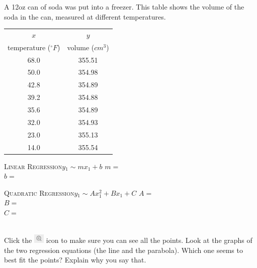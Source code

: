\documentclass[12pt,letterpaper]{memoir}
\begin{document}
{
    A 12oz can of soda was put into a freezer.
    This table shows the volume of the soda in the can,
    measured at different temperatures.\\[0.5em]
    \begin{minipage}{0.35\textwidth}
        \footnotesize
        \begin{tabular}{cc}
            $x$ & $y$ \\ 
            temperature (${}^\circ F$) & volume ($cm^3$) \\
            \midrule 
            68.0 & 355.51 \\
            50.0 & 354.98 \\ 
            42.8 & 354.89 \\ 
            39.2 & 354.88 \\ 
            35.6 & 354.89 \\ 
            32.0 & 354.93 \\ 
            23.0 & 355.13 \\ 
            14.0 & 355.54 \\ 
            \bottomrule
        \end{tabular}
        \end{minipage}
    \begin{minipage}{0.64\textwidth}
        \begin{tcolorbox}[colback=white,width=\textwidth]
            \small
            \scshape{Linear Regression}\hfill$y_1 \sim m x_1 + b$
            \tcblower
            $m =$  \\
            $b =$ 
        \end{tcolorbox}
        \begin{tcolorbox}[colback=white,width=\textwidth]
            \small
            \scshape{Quadratic Regression}\hfill$y_1 \sim A x_1^2 + B x_1 + C$
            \tcblower
            $A =$  \\
            $B =$ \\
            $C =$ 
        \end{tcolorbox}
    \end{minipage}\\[1\onelineskip]
    Click the 
    \includegraphics[width=0.2in]{magnifying-glass-plus.png} 
    icon to make sure you can see all the points.
    Look at the graphs of the two regression equations 
    (the line and the parabola).
    Which one seems to best fit the points?
    Explain why you say that.
    \vspace{0.7in}
}
\end{document}

